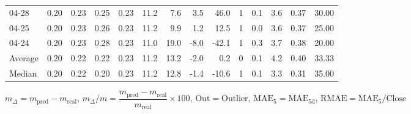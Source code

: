 \begin{threeparttable}
{\begin{tabular}{lrrrrrrrrrrrrr}
  04-28 &          0.20 &          0.23 &          0.25 &        0.23 &                11.2 &                 7.6 &        3.5 &         46.0 &              1 &                 0.1 &              3.6 &            0.37 &                  30.00 \\
  04-25 &          0.20 &          0.23 &          0.26 &        0.23 &                11.2 &                 9.9 &        1.2 &         12.5 &              1 &                 0.0 &              3.6 &            0.37 &                  25.00 \\
  04-24 &          0.20 &          0.23 &          0.28 &        0.23 &                11.0 &                19.0 &       -8.0 &        -42.1 &              1 &                 0.3 &              3.7 &            0.38 &                  20.00 \\
Average &          0.20 &          0.22 &          0.22 &        0.23 &                11.2 &                13.2 &       -2.0 &          0.2 &              0 &                 0.1 &              4.2 &            0.40 &                  33.33 \\
 Median &          0.20 &          0.22 &          0.20 &        0.23 &                11.2 &                12.8 &       -1.4 &        -10.6 &              1 &                 0.1 &              3.3 &            0.31 &                  35.00 \\
\bottomrule
\end{tabular}
}
\begin{tablenotes}\footnotesize
\item $m_\Delta=m_{\text{pred}}-m_{\text{real}}$,
$m_\Delta/m=\dfrac{m_{\text{pred}}-m_{\text{real}}}{m_{\text{real}}}\times100$,
$\mathrm{Out}=\text{Outlier}$,
$\mathrm{MAE}_5=\mathrm{MAE}_{5\text{d}}$,
$\mathrm{RMAE}=\mathrm{MAE}_5/\text{Close}$
\end{tablenotes}
\end{threeparttable}
\endgroup

